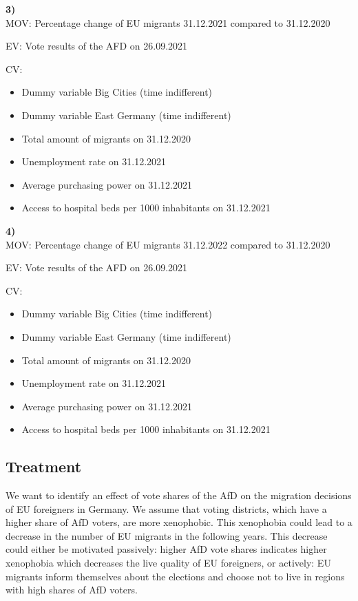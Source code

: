 \documentclass[
  letterpaper,
  DIV=11,
  numbers=noendperiod]{scrartcl}
\begin{document}
\textbf{3)}\\
MOV: Percentage change of EU migrants 31.12.2021 compared to 31.12.2020

EV: Vote results of the AFD on 26.09.2021

CV:

\begin{itemize}
\item
  Dummy variable Big Cities (time indifferent)
\item
  Dummy variable East Germany (time indifferent)
\item
  Total amount of migrants on 31.12.2020
\item
  Unemployment rate on 31.12.2021
\item
  Average purchasing power on 31.12.2021
\item
  Access to hospital beds per 1000 inhabitants on 31.12.2021
\end{itemize}

\textbf{4)}\\
MOV: Percentage change of EU migrants 31.12.2022 compared to 31.12.2020

EV: Vote results of the AFD on 26.09.2021

CV:

\begin{itemize}
\item
  Dummy variable Big Cities (time indifferent)
\item
  Dummy variable East Germany (time indifferent)
\item
  Total amount of migrants on 31.12.2020
\item
  Unemployment rate on 31.12.2021
\item
  Average purchasing power on 31.12.2021
\item
  Access to hospital beds per 1000 inhabitants on 31.12.2021
\end{itemize}

\subsection{Treatment}\label{treatment}

We want to identify an effect of vote shares of the AfD on the migration
decisions of EU foreigners in Germany. We assume that voting districts,
which have a higher share of AfD voters, are more xenophobic. This
xenophobia could lead to a decrease in the number of EU migrants in the
following years. This decrease could either be motivated passively:
higher AfD vote shares indicates higher xenophobia which decreases the
live quality of EU foreigners, or actively: EU migrants inform
themselves about the elections and choose not to live in regions with
high shares of AfD voters.
\end{document}
